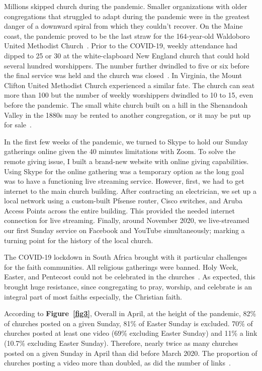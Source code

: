 Millions skipped church during the pandemic. Smaller organizations with older congregations that struggled to adapt during the pandemic were in the greatest danger of a downward spiral from which they couldn't recover. On the Maine coast, the pandemic proved to be the last straw for the 164-year-old Waldoboro United Methodist Church~\cite{sharp}.  Prior to the COVID-19, weekly attendance had dipped to 25 or 30 at the white-clapboard New England church that could hold several hundred worshippers. The number further dwindled to five or six before the final service was held and the church was closed~\cite{sharp}. In Virginia, the Mount Clifton United Methodist Church experienced a similar fate. The church can seat more than 100 but the number of weekly worshippers dwindled to 10 to 15, even before the pandemic. The small white church built on a hill in the Shenandoah Valley in the 1880s may be rented to another congregation, or it may be put up for sale~\cite{sharp}.

In the first few weeks of the pandemic, we turned to Skype to hold our Sunday gatherings online given the 40 minutes limitations with Zoom. To solve the remote giving issue, I built a brand-new website with online giving capabilities. Using Skype for the online gathering was a temporary option as the long goal was to have a functioning live streaming service. However, first, we had to get internet to the main church building. After contracting an electrician, we set up a local network using a custom-built Pfsense router, Cisco switches, and Aruba Access Points across the entire building. This provided the needed internet connection for live streaming. Finally, around November 2020, we live-streamed our first Sunday service on Facebook and YouTube simultaneously; marking a turning point for the history of the local church.

The COVID-19 lockdown in South Africa brought with it particular challenges for the faith communities. All religious gatherings were
banned. Holy Week, Easter, and Pentecost could not be celebrated in the churches~\cite{jerry:pillay}. As expected, this brought huge resistance, since congregating to pray, worship, and celebrate is an integral part of most faiths especially, the Christian faith.

According to \textbf{Figure~\ref{fig3}}, Overall in April, at the height of the pandemic, 82\% of churches posted on a given Sunday, 81\% of Easter Sunday is excluded. 70\% of churches posted at least one video (69\% excluding Easter Sunday) and 11\% a link (10.7\% excluding Easter Sunday). Therefore, nearly twice as many churches posted on a given Sunday in April than did before March 2020. The proportion of churches posting a video more than doubled, as did the number of links~\cite{Raiber}.

